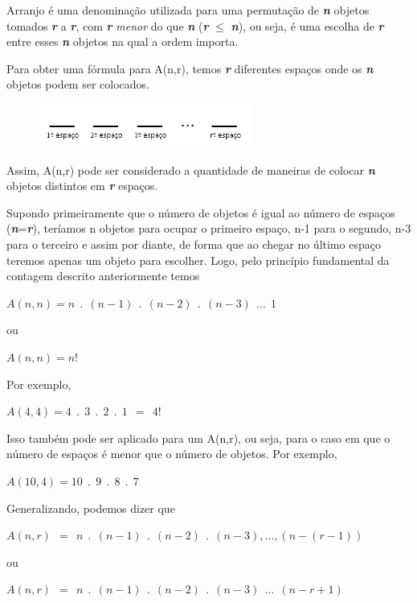 Arranjo é uma denominação utilizada para uma permutação de \textbf{\textit{n}} objetos tomados \textbf{\textit{r}} a \textbf{\textit{r}}, com \textbf{\textit{r}} \textit{menor} do que \textbf{\textit{n}} (\textbf{\textit{r}} $\leq$ \textbf{\textit{n}}), ou seja, é uma escolha de \textbf{\textit{r}} entre esses \textbf{\textit{n}} objetos na qual a ordem importa.

Para obter uma fórmula para A(n,r), temos \textbf{\textit{r}} diferentes espaços onde os \textbf{\textit{n}} objetos podem ser colocados.

\begin{figure}[H]
	\centering

	\includegraphics[width=7cm]{imagens/arranjo_demo.png}

\end{figure}

Assim, A(n,r) pode ser considerado a quantidade de maneiras de colocar \textbf{\textit{n}} objetos distintos em \textbf{\textit{r}} espaços.

Supondo primeiramente que o número de objetos é igual ao número de espaços (\textbf{\textit{n}}=\textbf{\textit{r}}), teríamos n objetos para ocupar o primeiro espaço, n-1 para o segundo, n-3 para o terceiro e assim por diante, de forma que ao chegar no último espaço teremos apenas um objeto para escolher.
Logo, pelo princípio fundamental da contagem descrito anteriormente temos
\begin{center}
	$A(n,n)=n\ \ .\ \ (n-1)\ \ .\ \ (n-2)\ \ .\ \ (n-3)\ \ ...\ \ 1$
	
ou

	$A(n,n)=n!$
\end{center}

\noindent 
Por exemplo, 
\begin{center}
	$A(4,4)= 4\ \ .\ \ 3\ \ .\ \ 2\ \ .\ \ 1\ \ =\ \ 4!$
\end{center}
Isso também pode ser aplicado para um A(n,r), ou seja, para o caso em que o número de espaços é menor que o número de objetos. Por exemplo,
\begin{center}
	$A(10,4)= 10\ \ .\ \ 9\ \ .\ \ 8\ \ .\ \ 7$
\end{center}
Generalizando, podemos dizer que
\begin{center}
	$A(n,r)\ \ =\ \ n\ \ .\ \ (n-1)\ \ .\ \ (n-2)\ \ .\ \ (n-3),...,(n-(r-1))$

ou

	$A(n,r)\ \ =\ \ n\ \ .\ \ (n-1)\ \ .\ \ (n-2)\ \ .\ \ (n-3)\ \ ...\ \ (n-r+1)$
\end{center}

